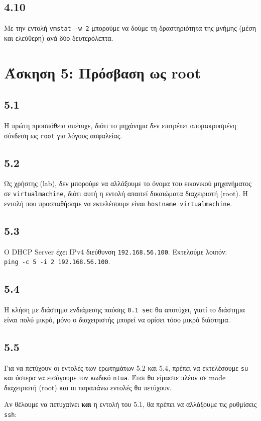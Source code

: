 \documentclass[a4paper, 12pt]{article}
\begin{document}
	\subsection*{4.10}
		Με την εντολή \verb|vmstat -w 2| μπορούμε να δούμε τη δραστηριότητα της μνήμης (μέση και ελεύθερη) ανά δύο δευτερόλεπτα.

\section*{Άσκηση 5: Πρόσβαση ως root}

	\subsection*{5.1}
		Η πρώτη προσπάθεια απέτυχε, διότι το μηχάνημα δεν επιτρέπει απομακρυσμένη σύνδεση ως \verb|root| για λόγους ασφαλείας.

	\subsection*{5.2}
		Ως χρήστης (lab), δεν μπορούμε να αλλάξουμε το όνομα του εικονικού μηχανήματος σε \verb|virtualmachine|, διότι αυτή η εντολή απαιτεί δικαιώματα διαχειριστή (root). Η εντολή που προσπαθήσαμε να εκτελέσουμε είναι \verb|hostname virtualmachine|.

	\subsection*{5.3}
		O DHCP Server έχει IPv4 διεύθυνση \verb|192.168.56.100|. Εκτελούμε λοιπόν: \\ 
		\verb|ping -c 5 -i 2 192.168.56.100|.

	\subsection*{5.4}
		Η κλήση με διάστημα ενδιάμεσης παύσης \verb|0.1 sec| θα αποτύχει, γιατί το διάστημα είναι πολύ μικρό, μόνο ο διαχειριστής μπορεί να ορίσει τόσο μικρό διάστημα. 

	\subsection*{5.5}
		Για να πετύχουν οι εντολές των ερωτημάτων 5.2 και 5.4, πρέπει να εκτελέσουμε \verb|su| και ύστερα να εισάγουμε τον κωδικό \verb|ntua|. Έτσι θα είμαστε πλέον σε mode διαχειριστή (root) και οι παραπάνω εντολές θα πετύχουν.
		
		Αν θέλουμε να πετυχαίνει \textbf{και} η εντολή του 5.1, θα πρέπει να αλλάξουμε τις ρυθμίσεις \verb|ssh|:
		
\end{document}
